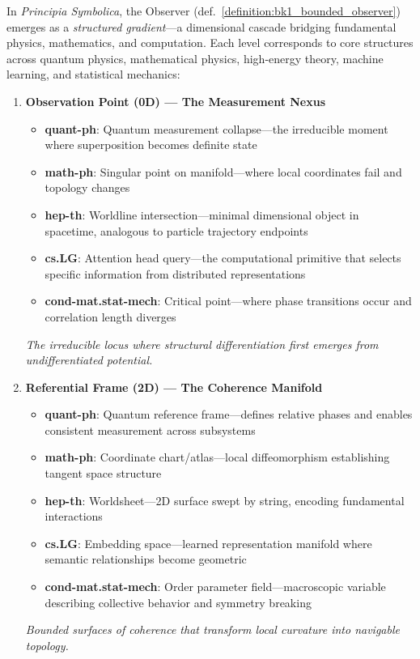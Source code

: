 \begin{definition}
\label{definition:observer_gradient}
In \textit{Principia Symbolica}, the Observer (def.~\ref{definition:bk1_bounded_observer}) emerges as a \textit{structured gradient}—a dimensional cascade bridging fundamental physics, mathematics, and computation. Each level corresponds to core structures across quantum physics, mathematical physics, high-energy theory, machine learning, and statistical mechanics:

\begin{enumerate}
  \item \textbf{Observation Point (0D) — The Measurement Nexus}  
  \begin{itemize}
    \item \textbf{quant-ph}: Quantum measurement collapse—the irreducible moment where superposition becomes definite state
    \item \textbf{math-ph}: Singular point on manifold—where local coordinates fail and topology changes
    \item \textbf{hep-th}: Worldline intersection—minimal dimensional object in spacetime, analogous to particle trajectory endpoints
    \item \textbf{cs.LG}: Attention head query—the computational primitive that selects specific information from distributed representations
    \item \textbf{cond-mat.stat-mech}: Critical point—where phase transitions occur and correlation length diverges
  \end{itemize}
  \textit{The irreducible locus where structural differentiation first emerges from undifferentiated potential.}

  \item \textbf{Referential Frame (2D) — The Coherence Manifold}  
  \begin{itemize}
    \item \textbf{quant-ph}: Quantum reference frame—defines relative phases and enables consistent measurement across subsystems
    \item \textbf{math-ph}: Coordinate chart/atlas—local diffeomorphism establishing tangent space structure
    \item \textbf{hep-th}: Worldsheet—2D surface swept by string, encoding fundamental interactions
    \item \textbf{cs.LG}: Embedding space—learned representation manifold where semantic relationships become geometric
    \item \textbf{cond-mat.stat-mech}: Order parameter field—macroscopic variable describing collective behavior and symmetry breaking
  \end{itemize}
  \textit{Bounded surfaces of coherence that transform local curvature into navigable topology.}


\end{enumerate}
\end{definition}
